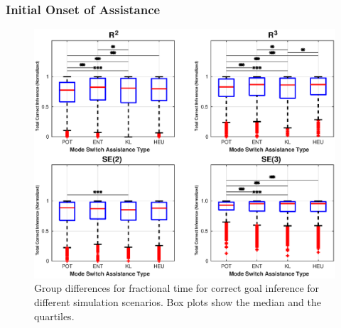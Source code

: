 \documentclass[conference]{IEEEtran}
\begin{document}
\subsubsection{Initial Onset of Assistance}
\begin{figure}[t!]
	\centering
	\includegraphics[width= 1.\hsize, height=1.3\vsize]{./figures/correct_inference.eps}
	\vspace{-0.75cm}
	\caption{Group differences for fractional time for correct goal inference for different simulation scenarios. Box plots show the median and the quartiles.} 
	\label{fig:correct_inference}
\end{figure}
\end{document}
